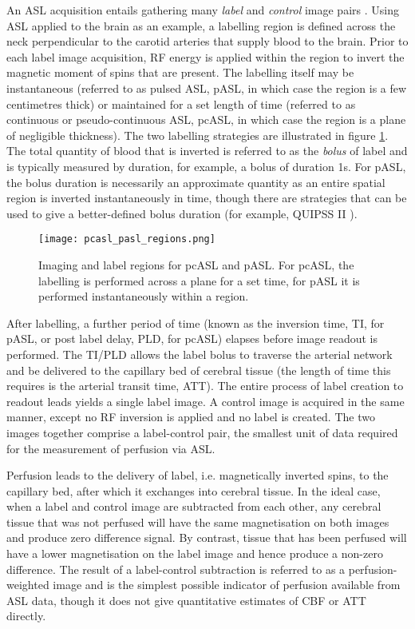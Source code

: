 An ASL acquisition entails gathering many \textit{label} and \textit{control} image pairs \cite{asl_primer}. Using ASL applied to the brain as an example, a labelling region is defined across the neck perpendicular to the carotid arteries that supply blood to the brain. Prior to each label image acquisition, RF energy is applied within the region to invert the magnetic moment of spins that are present. The labelling itself may be instantaneous (referred to as pulsed ASL, pASL, in which case the region is a few centimetres thick) or maintained for a set length of time (referred to as continuous or pseudo-continuous ASL, pcASL, in which case the region is a plane of negligible thickness). The two labelling strategies are illustrated in figure \ref{label_regions}. The total quantity of blood that is inverted is referred to as the \textit{bolus} of label and is typically measured by duration, for example, a bolus of duration 1s. For pASL, the bolus duration is necessarily an approximate quantity as an entire spatial region is inverted instantaneously in time, though there are strategies that can be used to give a better-defined bolus duration (for example, QUIPSS II \cite{asl_primer}). 

\begin{figure}[h]
\centering
\texttt{[image: pcasl\_pasl\_regions.png]}
\caption{Imaging and label regions for pcASL and pASL. For pcASL, the labelling is performed across a plane for a set time, for pASL it is performed instantaneously within a region.}
\label{label_regions}
\end{figure}

After labelling, a further period of time (known as the inversion time, TI, for pASL, or post label delay, PLD, for pcASL) elapses before image readout is performed. The TI/PLD allows the label bolus to traverse the arterial network and be delivered to the capillary bed of cerebral tissue (the length of time this requires is the arterial transit time, ATT). The entire process of label creation to readout leads yields a single label image. A control image is acquired in the same manner, except no RF inversion is applied and no label is created. The two images together comprise a label-control pair, the smallest unit of data required for the measurement of perfusion via ASL. 

Perfusion leads to the delivery of label, i.e. magnetically inverted spins, to the capillary bed, after which it exchanges into cerebral tissue. In the ideal case, when a label and control image are subtracted from each other, any cerebral tissue that was not perfused will have the same magnetisation on both images and produce zero difference signal. By contrast, tissue that has been perfused will have a lower magnetisation on the label image and hence produce a non-zero difference. The result of a label-control subtraction is referred to as a perfusion-weighted image and is the simplest possible indicator of perfusion available from ASL data, though it does not give quantitative estimates of CBF or ATT directly. 

